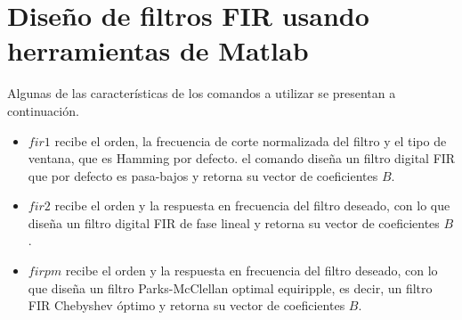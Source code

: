 \documentclass[letterpaper,onecolumn,10pt,journal,final]{IEEEtran}
\begin{document}
\section{Diseño de filtros FIR usando herramientas de Matlab}
Algunas de las características de los comandos a utilizar se presentan a continuación.
\begin{itemize}
    \item $fir1$ recibe el orden, la frecuencia de corte normalizada del filtro y el tipo de ventana, que es Hamming por defecto. el comando diseña un filtro digital FIR que por defecto es pasa-bajos y retorna su vector de coeficientes $B$.
    \item $fir2$ recibe el orden y la respuesta en frecuencia del filtro deseado, con lo que diseña un filtro digital FIR de fase lineal y retorna su vector de coeficientes $B$.
    \item $firpm$ recibe el orden y la respuesta en frecuencia del filtro deseado, con lo que diseña un filtro Parks-McClellan optimal equiripple, es decir, un filtro FIR Chebyshev óptimo y retorna su vector de coeficientes $B$.
\end{itemize}
\end{document}
